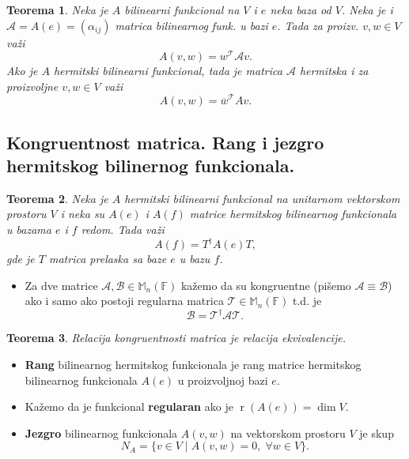 \documentclass[a4paper,12pt,twoside]{report}
\newtheorem{theorem}{Teorema}[section]
\numberwithin{algorithm}{section}
\begin{document}
\begin{theorem}
    Neka je $A$ bilinearni funkcional na $V$ i $e$ neka baza od $V$. Neka je i $\mathcal{A} = A(e) = (\alpha_{ij})$ matrica bilinearnog funk. u 
    bazi $e$. Tada za proizv. $v, w \in V$ važi 
    \[ A(v, w) = w^\mathcal{T}\mathcal{A}v. \]
    Ako je $A$ hermitski bilinearni funkcional, tada je matrica $\mathcal{A}$ hermitska i za proizvoljne $v, w \in V$ važi
    \[ A(v, w) = \overline{w}^\mathcal{T}Av. \]
\end{theorem}

\subsection{Kongruentnost matrica. Rang i jezgro hermitskog bilinernog funkcionala.}
\begin{theorem}
    Neka je $A$ hermitski bilinearni funkcional na unitarnom vektorskom prostoru $V$ i neka su $A(e)$ i $A(f)$ matrice hermitskog bilinearnog funkcionala u 
    bazama $e$ i $f$ redom. Tada važi
    \[ A(f) = T^\dagger A(e)T, \] gde je $T$ matrica prelaska sa baze $e$ u bazu $f$.
\end{theorem}

\begin{itemize}
    \item Za dve matrice $\mathcal{A, B} \in \mathbb{M}_n(\mathbb{F})$ kažemo da su kongruentne (pišemo $\mathcal{A}\equiv \mathcal{B}$) ako i samo ako
    postoji regularna matrica $\mathcal{T} \in \mathbb{M}_n(\mathbb{F})$ t.d. je 
    \[ \mathcal{B} = \mathcal{T}^\dagger\mathcal{AT}. \]
\end{itemize}

\begin{theorem}
    Relacija kongruentnosti matrica je relacija ekvivalencije.
\end{theorem}

\begin{itemize}
    \item \textbf{Rang} bilinearnog hermitskog funkcionala je rang matrice hermitskog bilinearnog funkcionala $A(e)$ u proizvoljnoj bazi $e$.
    \item Kažemo da je funkcional \textbf{regularan} ako je $\operatorname{r}(A(e)) = \dim V$.
    \item \textbf{Jezgro} bilinearnog funkcionala $A(v, w)$ na vektorskom prostoru $V$ je skup
    \[ N_A = \{ v \in V \;|\; A(v, w) = 0, \; \forall w \in V \}. \]
\end{itemize}
\end{document}
